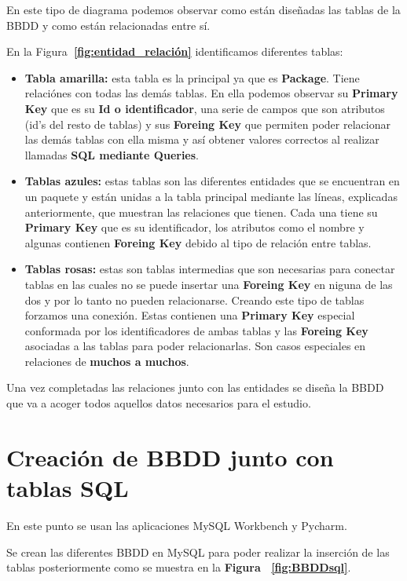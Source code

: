 \documentclass[a4paper, 12pt]{book}
\begin{document}
En este tipo de diagrama podemos observar como están diseñadas las tablas de la BBDD y como están relacionadas entre sí.

En la Figura\textbf {~\ref{fig:entidad_relación}} identificamos diferentes tablas:

\begin{itemize}
	\item \textbf {Tabla amarilla: }esta tabla es la principal ya que es \textbf {Package}. Tiene relaciónes con todas las demás tablas. En ella podemos observar su \textbf {Primary Key} que es su \textbf {Id o identificador}, una serie de campos que son atributos (id's del resto de tablas) y sus \textbf {Foreing Key} que permiten poder relacionar las demás tablas con ella misma y así obtener valores correctos al realizar llamadas \textbf {SQL mediante Queries}.
	
	\item \textbf {Tablas azules: }estas tablas son las diferentes entidades que se encuentran en un paquete y están unidas a la tabla principal mediante las líneas, explicadas anteriormente, que muestran las relaciones que tienen.
	Cada una tiene su \textbf {Primary Key} que es su identificador, los atributos como el nombre y algunas contienen \textbf {Foreing Key} debido al tipo de relación entre tablas.
	
	\item \textbf {Tablas rosas: }estas son tablas intermedias que son necesarias para conectar tablas en las cuales no se puede insertar una \textbf {Foreing Key} en niguna de las dos y por lo tanto no pueden relacionarse. Creando este tipo de tablas forzamos una conexión. Estas contienen una \textbf {Primary Key} especial conformada por los identificadores de ambas tablas y las \textbf {Foreing Key} asociadas a las tablas para poder relacionarlas.
	Son casos especiales en relaciones de \textbf {muchos a muchos}.
\end{itemize}

Una vez completadas las relaciones junto con las entidades se diseña la BBDD que va a acoger todos aquellos datos necesarios para el estudio.

\section{Creación de BBDD junto con tablas SQL} 
\label{sec:creacion_BBDD}
En este punto se usan las aplicaciones MySQL Workbench y Pycharm.

Se crean las diferentes BBDD en MySQL para poder realizar la inserción de las tablas posteriormente como se muestra en la \textbf {Figura ~\ref{fig:BBDDsql}}.
\end{document}
